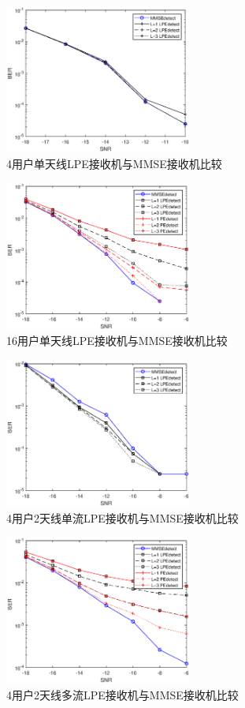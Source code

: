 \documentclass[bachelor,nocolorlinks, printoneside]{seuthesis} %
\begin{document}
\begin{Main}
\begin{figure}[htbp!]
	\centering \includegraphics[width=0.55\textwidth]{img/4_8.eps} \caption{4用户单天线LPE接收机与MMSE接收机比较}
\end{figure}
\begin{figure}[htbp!]
	\centering \includegraphics[width=0.55\textwidth]{img/4_12.eps} \caption{16用户单天线LPE接收机与MMSE接收机比较}
\end{figure}
\begin{figure}[htbp!]
	\centering \includegraphics[width=0.55\textwidth]{img/4_9.eps} \caption{4用户2天线单流LPE接收机与MMSE接收机比较}
\end{figure}
\begin{figure}[htbp!]
	\centering \includegraphics[width=0.55\textwidth]{img/4_10.eps} \caption{4用户2天线多流LPE接收机与MMSE接收机比较}

\end{figure}
\end{Main}
\end{document}
